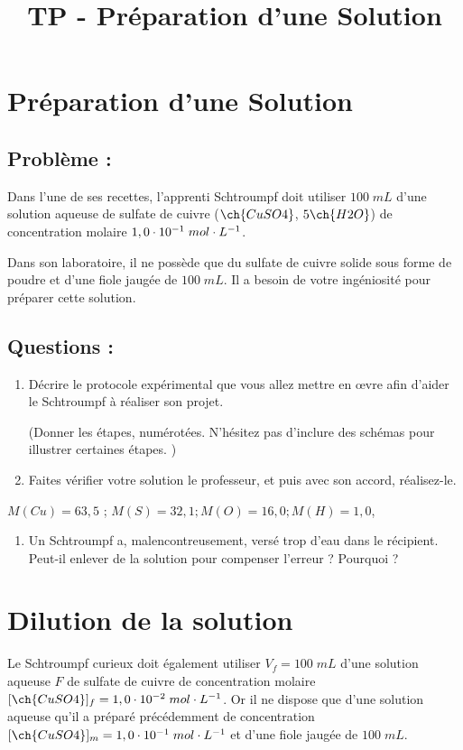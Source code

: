 \documentclass[12pt,a4paper]{article}
\title{TP - Préparation d'une Solution}
\date{}
\author{}
\begin{document}
\maketitle
\vspace{-3cm}

\section{Préparation d'une Solution}
\subsection*{Problème : }
Dans l'une de ses recettes, l'apprenti Schtroumpf doit utiliser $100\; mL$ d'une solution aqueuse de sulfate de cuivre ($\ch{CuSO4}$, $5\ch{H2O}$) de concentration molaire $1,0\cdot10^{-1}\; mol\cdot L^{-1}$.

Dans son laboratoire, il ne possède que du sulfate de cuivre solide sous forme de poudre et d'une fiole jaugée de $100\; mL$. Il a besoin de votre ingéniosité pour préparer cette solution.

\subsection*{Questions : }
\begin{enumerate}
    \item Décrire le protocole expérimental que vous allez mettre en \oe vre afin d'aider le Schtroumpf à réaliser son projet. 
    
    (Donner les étapes, numérotées. N'hésitez pas d'inclure des schémas pour illustrer certaines étapes. )
    \item Faites vérifier votre solution le professeur, et puis avec son accord, réalisez-le. 
\end{enumerate}
\begin{tcolorbox}[title=Données : Masses molaires ($g\cdot mol^{-1} $)]
$M(Cu) = 63,5$ ;  $M(S) = 32,1 ;  M(O) = 16,0 ; M(H) = 1,0$, 
\end{tcolorbox}

\begin{enumerate}[resume]
    \item Un Schtroumpf a, malencontreusement,  versé trop d’eau dans le récipient.  Peut-il enlever de la solution pour compenser l’erreur ? Pourquoi ?
\end{enumerate}

\section{Dilution de la solution}
Le Schtroumpf curieux doit également utiliser $V_f = 100\; mL$ d'une solution aqueuse $F$ de sulfate de cuivre de concentration molaire $[\ch{CuSO4}]_f = 1,0\es{-2}\mpl$. Or il ne dispose que d'une solution aqueuse qu'il a préparé précédemment de concentration $[\ch{CuSO4}]_m = 1,0\es{-1}\mpl$ et d'une fiole jaugée de $100\; mL$. 
\end{document}
